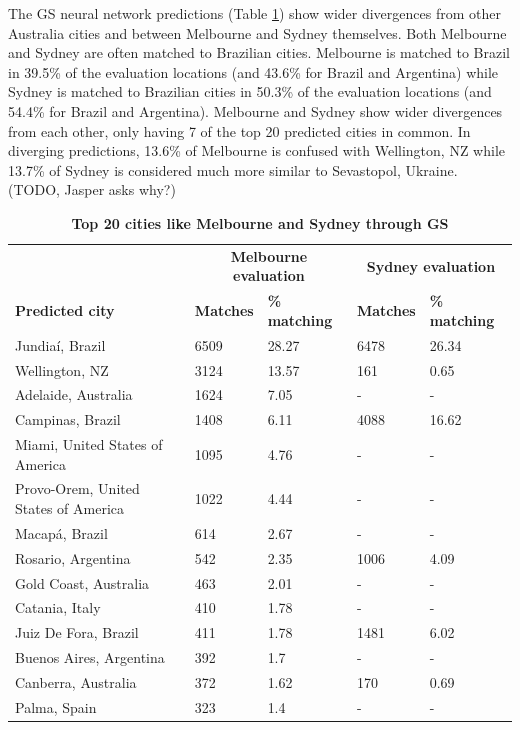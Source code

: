 \documentclass[10pt,letterpaper]{article}
\begin{document}
The GS neural network predictions (Table \ref{tab:melbournesydneyGS}) show wider divergences from other Australia cities and between Melbourne and Sydney themselves. Both Melbourne and Sydney are often matched to Brazilian cities. Melbourne is matched to Brazil in 39.5\% of the evaluation locations (and 43.6\% for Brazil and Argentina) while Sydney is matched to Brazilian cities in 50.3\% of the evaluation locations (and 54.4\% for Brazil and Argentina). Melbourne and Sydney show wider divergences from each other, only having 7 of the top 20 predicted cities in common. In diverging predictions, 13.6\% of Melbourne is confused with Wellington, NZ while 13.7\% of Sydney is considered much more similar to Sevastopol, Ukraine. (TODO, Jasper asks why?)

\begin{table}[!htbp]
\begin{adjustwidth}{-2.25in}{0in}
\caption{\bf Top 20 cities like Melbourne and Sydney through GS \label{tab:melbournesydneyGS}}     
\begin{tabular}{ l  l l l  l}
 \hline    &  \multicolumn{2}{c}{\textbf{Melbourne evaluation}} & \multicolumn{2}{c}{\textbf{Sydney evaluation}}  \\  
\textbf{Predicted city} & \textbf{Matches} & \textbf{\% matching}  & \textbf{Matches} & \textbf{\% matching}\\ \hline
Jundia\'{i}, Brazil & 6509 & 28.27 & 6478 & 26.34 \\ 
Wellington, NZ & 3124 & 13.57 & 161 & 0.65 \\ 
Adelaide, Australia & 1624 & 7.05 &-&- \\ 
Campinas, Brazil & 1408 & 6.11 & 4088 & 16.62 \\ 
Miami, United States of America & 1095 & 4.76 &-&- \\ 
Provo-Orem, United States of America & 1022 & 4.44 &-&- \\ 
Macap\'{a}, Brazil & 614 & 2.67 &-&- \\ 
Rosario, Argentina & 542 & 2.35 & 1006 & 4.09 \\ 
Gold Coast, Australia & 463 & 2.01 &-&- \\ 
Catania, Italy & 410 & 1.78 &-&- \\ 
Juiz De Fora, Brazil & 411 & 1.78 & 1481 & 6.02 \\ 
Buenos Aires, Argentina & 392 & 1.7 &-&- \\ 
Canberra, Australia & 372 & 1.62 & 170 & 0.69 \\ 
Palma, Spain & 323 & 1.4 &-&- \\ 

\end{tabular}
\end{adjustwidth}
\end{table}
\end{document}
